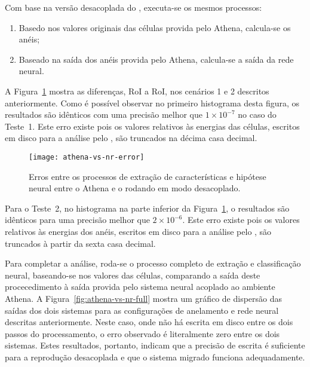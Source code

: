 Com base na versão desacoplada do , executa-se os mesmos
processos:

\begin{enumerate}
\item Basedo nos valores originais das células provida pelo Athena, calcula-se
os anéis; 
\item Baseado na saída dos anéis provida pelo Athena, calcula-se a saída da
rede neural.
\end{enumerate}

A Figura~\ref{fig:athena-vs-nr} mostra as diferenças, RoI a RoI, nos cenários
1 e 2 descritos anteriormente. Como é possível observar no primeiro histograma
desta figura, os resultados são idênticos com uma precisão melhor que $1
\times 10^{-7}$ no caso do Teste~1. Este erro existe pois os valores relativos
às energias das células, escritos em disco para a análise pelo
, são truncados na décima casa decimal.

\begin{figure}
\begin{center}
\texttt{[image: athena-vs-nr-error]}
\end{center}
\caption{Erros entre os processos de extração de características e hipótese
neural entre o Athena e o  rodando em modo desacoplado.}
\label{fig:athena-vs-nr}
\end{figure}

Para o Teste~2, no histograma na parte inferior da
Figura~\ref{fig:athena-vs-nr}, o resultados são idênticos para uma precisão
melhor que $2 \times 10^{-6}$. Este erro existe pois os valores relativos às
energias dos anéis, escritos em disco para a análise pelo ,
são truncados à partir da sexta casa decimal.

Para completar a análise, roda-se o processo completo de extração e
classificação neural, baseando-se nos valores das células, comparando a saída
deste procecedimento à saída provida pelo sistema neural acoplado ao ambiente
Athena. A Figura~\ref{fig:athena-vs-nr-full} mostra um gráfico de dispersão
das saídas dos dois sistemas para as configurações de anelamento e rede neural
descritas anteriormente. Neste caso, onde não há escrita em disco entre os
dois passos do processamento, o erro observado é literalmente zero entre os
dois sistemas. Estes resultados, portanto, indicam que a precisão de escrita é
suficiente para a reprodução desacoplada e que o sistema migrado funciona
adequadamente.

